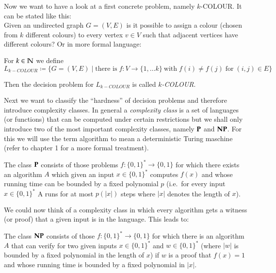 Now we want to have a look at a first concrete problem, namely $k$-COLOUR. It can be stated like this: \\
 Given an undirected graph $ G = (V,E)$ is it possible to assign a colour (chosen from $k$ different colours) to every vertex 
 $v \in V$ such that adjacent vertices have different colours? Or in more formal language:

\begin{Problem}[$k$-COLOUR]
 For $k \in \mathbb{N}$ we define $$L_{k-COLOUR} \coloneqq \lbrace G  = (V,E) \; | 
 \; \text{there is} \; f \colon V \to \lbrace 1, \dotsc k \rbrace
 \ \text{with} \; f(i) \neq f(j) \; \text{for} \; (i,j) \in E \rbrace $$
 
 Then the decision problem for $L_{k-COLOUR}$ is called \emph{$k$-COLOUR}.
\end{Problem}

Next we want to classify the ``hardness'' of decision problems and therefore introduce complexity classes. 
 In general a \emph{complexity class}
 is a set of languages (or functions) that can be computed under certain restrictions but  we shall only introduce two 
 of the most important complexity classes, namely $\mathbf{P}$ and $\mathbf{NP}$. For this we will use the term algorithm
 to mean a deterministic Turing maschine (refer to \cite{Arora2009} chapter 1 for a more formal treatment). 
 
\begin{Definition}
 The class $\mathbf{P}$ consists of those problems $f \colon {\lbrace 0,1 \rbrace}^* \to {\lbrace 0,1 \rbrace}$ for
 which there exists an algorithm $A$ which given an input $x \in {\lbrace 0,1 \rbrace}^*$
 computes $f(x)$ and whose running time can be bounded by a fixed polynomial $p$ (i.e.\
 for every input $x \in {\lbrace 0,1 \rbrace}^*$ A runs for at most $p(|x|)$ steps where $|x|$ denotes the length of $x$).
\end{Definition}

We could now think of a complexity class in which every algorithm gets a witness (or proof) that a given input is in the language.
This leads to:

\begin{Definition}
 The class $\mathbf{NP}$ consists of those $f \colon {\lbrace 0,1 \rbrace}^* \to {\lbrace 0,1 \rbrace}$ for which there is
 an algorithm $A$ that can verify for two given inputs $x \in {\lbrace 0,1 \rbrace}^*$ and 
 $w \in {\lbrace 0,1 \rbrace}^*$ (where $|w|$ is bounded by a fixed polynomial in the length of $x$) if $w$ is a proof
 that $f(x) = 1$ and whose running time is bounded by a fixed polynomial in  $|x|$.
\end{Definition}

